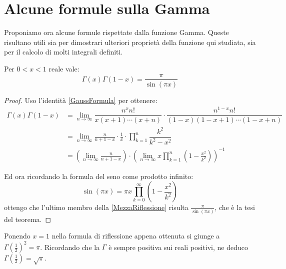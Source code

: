 \section{Alcune formule sulla Gamma}
Proponiamo ora alcune formule rispettate dalla funzione Gamma. Queste risultano utili sia per dimostrari ulteriori proprietà della
funzione qui studiata, sia per il calcolo di molti integrali definiti.

\begin{theorem} \label{Riflessione}
	Per $0<x<1$ reale vale:
	\begin{equation*}
		\Gamma(x)\Gamma(1-x)=\frac{\pi}{\sin(\pi x)}
	\end{equation*}
\end{theorem}
\begin{proof}
	Uso l'identità \cref{GaussFormula} per ottenere:
	\begin{equation}\begin{split} \label{MezzaRiflessione}
		\Gamma(x)\Gamma(1-x) & = \lim_{n\to\infty} \dfrac{n^xn!}{x(x+1)\cdots (x+n)} \cdot 
		\dfrac{n^{1-x}n!}{(1-x)(1-x+1)\cdots (1-x+n)}\\
		& =\lim_{n\to\infty} \frac{n}{n+1-x} \cdot \frac{1}{x} \cdot \prod_{k=1}^{n}\dfrac{k^2}{k^2-x^2} \\
		& =\left(\lim_{n\to\infty} \frac{n}{n+1-x} \right) \cdot 
		\left( \lim_{n\to\infty} x \prod_{k=1}^{n}\left(1-\frac{x^2}{k^2}\right) \right)^{-1}
	\end{split}\end{equation}

	Ed ora ricordando la formula del seno come prodotto infinito:
	\begin{equation*}
		\sin(\pi x)=\pi x \prod_{k=0}^{\infty} \left(1-\frac{x^2}{k^2}\right)
	\end{equation*}
	ottengo che l'ultimo membro della \cref{MezzaRiflessione} risulta $\frac{\pi}{\sin(\pi x)}$, che è la tesi del teorema.
\end{proof}

\begin{remark}
	Ponendo $x=1$ nella formula di riflessione appena ottenuta si giunge a $\Gamma\left(\frac12\right)^2=\pi$. 
	Ricordando che la $\Gamma$ è sempre positiva sui reali positivi, ne deduco $\Gamma\left(\frac12\right)=\sqrt\pi$.
\end{remark}


